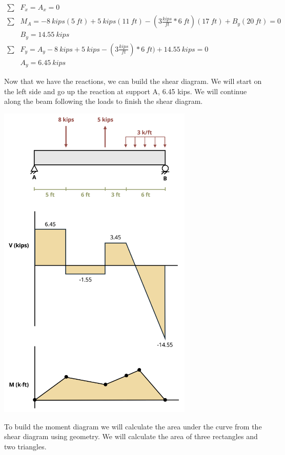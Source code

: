 \documentclass[
  letterpaper,
  DIV=11,
  numbers=noendperiod]{scrreprt}
\begin{document}
\begin{tcolorbox}
\begin{tcolorbox}
\[
\begin{aligned}
\sum& F_x =A_x =0\\
\sum& M_A =-8{~kips}(5{~ft})+5{~kips}(11{~ft})-(3\frac{kips}{ft}*6{~ft})(17{~ft})+B_y(20{~ft})=0 \\
&B_y =14.55{~kips} \\
\sum& F_y=A_y-8{~kips}+5{~kips}-(3\frac{kips}{ft})*6{~ft})+14.55{~kips}=0 \\
&A_y=6.45{~kips}
\end{aligned}
\]

Now that we have the reactions, we can build the shear diagram. We will
start on the left side and go up the reaction at support A, 6.45 kips.
We will continue along the beam following the loads to finish the shear
diagram.

\begin{center}
\includegraphics[width=3.66667in,height=\textheight]{images/CH9 PNGs/Example 9.3 part 3.png}
\end{center}

To build the moment diagram we will calculate the area under the curve
from the shear diagram using geometry. We will calculate the area of
three rectangles and two triangles.


\end{tcolorbox}
\end{tcolorbox}
\end{document}
